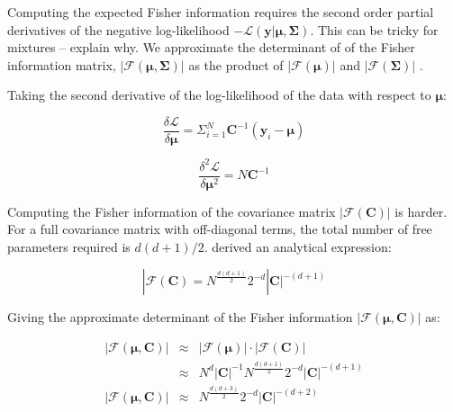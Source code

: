 \documentclass{aastex61}
\begin{document}
Computing the expected Fisher information requires the second order partial
derivatives of the negative log-likelihood $-\mathcal{L}(\bm{y}|\bm{\mu},\bm{\Sigma})$.
This can be tricky for mixtures -- explain why.
We approximate the determinant of of the Fisher information matrix,
$|\mathcal{F}(\bm{\mu},\bm{\Sigma})|$ as the product of $|\mathcal{F}\left(\bm{\mu}\right)|$ and $|\mathcal{F}\left(\bm{\Sigma}\right)|$ \citep{Oliver_1996,Roberts_1998}.


Taking the second derivative of the log-likelihood of the data with respect to $\bm{\mu}$:

\begin{equation}
\frac{\delta\mathcal{L}}{\delta\bm{\mu}} = \Sigma_{i=1}^{N}\bm{C}^{-1}(\bm{y}_i - \bm{\mu})
\end{equation}

\begin{equation}
\frac{\delta^2\mathcal{L}}{\delta\bm{\mu}^2} = N\bm{C}^{-1}
\end{equation}


Computing the Fisher information of the covariance matrix $|\mathcal{F}\left(\bm{C}\right)|$ is harder. For a full covariance matrix with off-diagonal terms, the total
number of free parameters required is $d(d+1)/2$.
\citep{Magnus_1988} derived an analytical expression:


\begin{equation}
|\mathcal{F}\left(\bm{C}\right) = N^\frac{d(d+1)}{2}2^{-d}|\bm{C}|^{-(d+1)}
\end{equation}

Giving the approximate determinant of the Fisher information $|\mathcal{F}\left(\bm{\mu},\bm{C}\right)|$ as:

\begin{eqnarray}
  |\mathcal{F}\left(\bm{\mu},\bm{C}\right)| & \approx & |\mathcal{F}\left(\bm{\mu}\right)|\cdot|\mathcal{F}\left(\bm{C}\right)| \\
  & \approx & N^{d}|\bm{C}|^{-1}N^\frac{d(d+1)}{2}2^{-d}|\bm{C}|^{-(d+1)} \\
  |\mathcal{F}\left(\bm{\mu},\bm{C}\right)| & \approx & N^\frac{d(d+3)}{2}2^{-d}|\bm{C}|^{-(d+2)}
\end{eqnarray}
\end{document}

